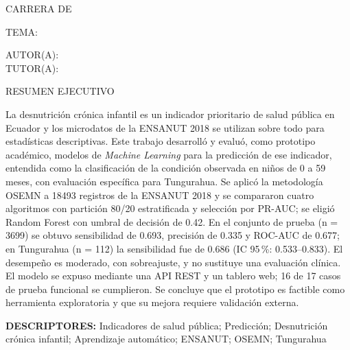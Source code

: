 \clearpage
\begin{center}
  \Universidad\par\vspace{2mm}
  \Facultad\par\vspace{2mm}
  CARRERA DE \Carrera
\end{center}
\vspace{2mm}
\noindent\hspace*{\parindent}TEMA: \Tema\par
\begin{center}
  AUTOR(A): \Autor\\
  TUTOR(A): \Tutor
\end{center}
\vspace{4mm}
\begin{center}RESUMEN EJECUTIVO\end{center}

La desnutrición crónica infantil es un indicador prioritario de salud pública en Ecuador y los microdatos de la ENSANUT 2018 se utilizan sobre todo para estadísticas descriptivas. Este trabajo desarrolló y evaluó, como prototipo académico, modelos de \textit{Machine Learning} para la predicción de ese indicador, entendida como la clasificación de la condición observada en niños de 0 a 59 meses, con evaluación específica para Tungurahua. Se aplicó la metodología OSEMN a \num{18493} registros de la ENSANUT 2018 y se compararon cuatro algoritmos con partición 80/20 estratificada y selección por PR-AUC; se eligió Random Forest con umbral de decisión de 0.42. En el conjunto de prueba (n = \num{3699}) se obtuvo sensibilidad de 0.693, precisión de 0.335 y ROC-AUC de 0.677; en Tungurahua (n = 112) la sensibilidad fue de 0.686 (IC 95\,\%: 0.533–0.833). El desempeño es moderado, con sobreajuste, y no sustituye una evaluación clínica. El modelo se expuso mediante una API REST y un tablero web; 16 de 17 casos de prueba funcional se cumplieron. Se concluye que el prototipo es factible como herramienta exploratoria y que su mejora requiere validación externa.

\noindent\textbf{DESCRIPTORES:} Indicadores de salud pública; Predicción; Desnutrición crónica infantil; Aprendizaje automático; ENSANUT; OSEMN; Tungurahua


